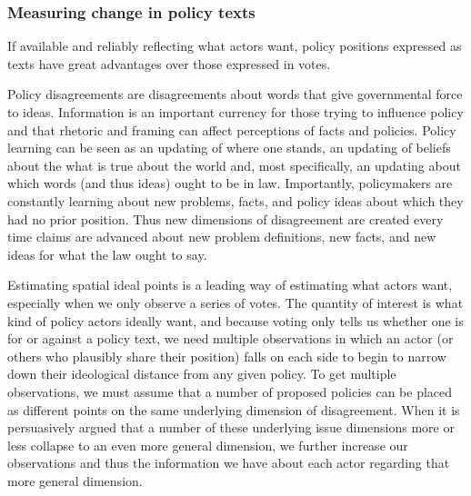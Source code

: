 
\subsubsection{Measuring change in policy texts}

If available and reliably reflecting what actors want, policy positions expressed as texts have great advantages over those expressed in votes.

Policy disagreements are disagreements about words that give governmental force to ideas. Information is an important currency for those trying to influence policy and that rhetoric and framing can affect perceptions of facts and policies. Policy learning can be seen as an updating of where one stands, an updating of beliefs about the what is true about the world and, most specifically, an updating about which words (and thus ideas) ought to be in law. Importantly, policymakers are constantly learning about new problems, facts, and policy ideas about which they had no prior position. Thus new dimensions of disagreement are created every time claims are advanced about new problem definitions, new facts, and new ideas for what the law ought to say.

Estimating spatial ideal points is a leading way of estimating what actors want, especially when we only observe a series of votes. The quantity of interest is what kind of policy actors ideally want, and because voting only tells us whether one is for or against a policy text, we need multiple observations in which an actor (or others who plausibly share their position) falls on each side to begin to narrow down their ideological distance from any given policy. To get multiple observations, we must assume that a number of proposed policies can be placed as different points on the same underlying dimension of disagreement. When it is persuasively argued that a number of these underlying issue dimensions more or less collapse to an even more general dimension, we further increase our observations and thus the information we have about each actor regarding that more general dimension. 

